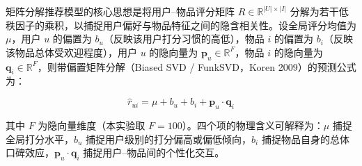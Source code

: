 \documentclass[UTF8,a4paper,10pt]{ctexart}
\begin{document}
矩阵分解推荐模型的核心思想是将用户--物品评分矩阵 $R\in\mathbb{R}^{|U|\times|I|}$ 分解为若干低秩因子的乘积，以捕捉用户偏好与物品特征之间的隐含相关性。设全局评分均值为 $\mu$，用户 $u$ 的偏置为 $b_u$（反映该用户打分习惯的高低），物品 $i$ 的偏置为 $b_i$（反映该物品总体受欢迎程度），用户 $u$ 的隐向量为 $\mathbf{p}_u\in\mathbb{R}^F$，物品 $i$ 的隐向量为 $\mathbf{q}_i\in\mathbb{R}^F$，则带偏置矩阵分解（Biased SVD / FunkSVD，Koren 2009）的预测公式为：

\begin{equation}
  \hat{r}_{ui} = \mu + b_u + b_i + \mathbf{p}_u \cdot \mathbf{q}_i
  \label{eq:biasedsvd}
\end{equation}

其中 $F$ 为隐向量维度（本实验取 $F=100$）。四个项的物理含义可解释为：$\mu$ 捕捉全局打分水平，$b_u$ 捕捉用户级别的打分偏高或偏低倾向，$b_i$ 捕捉物品自身的总体口碑效应，$\mathbf{p}_u\cdot\mathbf{q}_i$ 捕捉用户--物品间的个性化交互。
\end{document}
